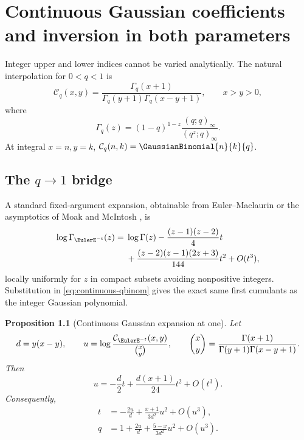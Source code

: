 \documentclass[11pt,a4paper,oneside,openany]{book}
\newtheorem{proposition}[theorem]{Proposition}
\theoremstyle{definition}
\theoremstyle{remark}
\begin{document}
\chapter{Continuous Gaussian coefficients and inversion in both parameters}

Integer upper and lower indices cannot be varied analytically.  The natural
interpolation for \(0<q<1\) is
\begin{equation}\label{eq:continuous-qbinom}
 \mathcal C_q(x,y)
 =\frac{\Gamma_q(x+1)}{\Gamma_q(y+1)\Gamma_q(x-y+1)},
 \qquad x>y>0,
\end{equation}
where
\begin{equation}\label{eq:qgamma-definition}
 \Gamma_q(z)=(1-q)^{1-z}\frac{(q;q)_\infty}{(q^z;q)_\infty}.
\end{equation}
At integral \(x=n,y=k\), \(\mathcal C_q(n,k)=\GaussianBinomial{n}{k}{q}\).

\section{The \texorpdfstring{$q\to1$}{q to 1} bridge}

A standard fixed-argument expansion, obtainable from Euler--Maclaurin or the
asymptotics of Moak and McIntosh \cite{Moak1984,McIntosh1999}, is
\begin{align}
 \log\Gamma_{\EulerE^{-t}}(z)
 ={}&\log\Gamma(z)
 -\frac{(z-1)(z-2)}4t\notag\\
 &+\frac{(z-2)(z-1)(2z+3)}{144}t^2+O(t^3),
\label{eq:qgamma-qone-expansion}
\end{align}
locally uniformly for \(z\) in compact subsets avoiding nonpositive
integers.  Substitution in \eqref{eq:continuous-qbinom} gives the exact same
first cumulants as the integer Gaussian polynomial.

\begin{proposition}[Continuous Gaussian expansion at one]\label{prop:continuous-qbin-qone}
Let
\[
 d=y(x-y),\qquad
 u=\log\frac{\mathcal C_{\EulerE^{-t}}(x,y)}{\binom{x}{y}},
 \qquad
 \binom{x}{y}=\frac{\Gamma(x+1)}{\Gamma(y+1)\Gamma(x-y+1)}.
\]
Then
\begin{equation}\label{eq:continuous-qbin-forward-one}
 u=-\frac d2t+\frac{d(x+1)}{24}t^2+O(t^3).
\end{equation}
Consequently,
\begin{align}
 t&=-\frac{2u}{d}+\frac{x+1}{3d^2}u^2+O(u^3),\label{eq:continuous-t-inverse-one}\\
 q&=1+\frac{2u}{d}+\frac{5-x}{3d^2}u^2+O(u^3).
\label{eq:continuous-q-inverse-one}
\end{align}
\end{proposition}
\end{document}
